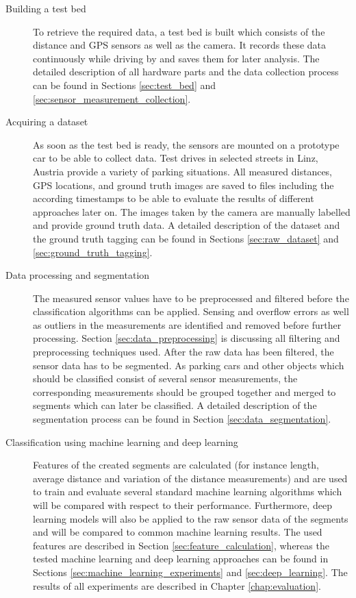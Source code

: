 \begin{description}

\item[Building a test bed] To retrieve the required data, a test bed is built which consists of the distance and GPS sensors as well as the camera. It records these data continuously while driving by and saves them for later analysis. The detailed description of all hardware parts and the data collection process can be found in Sections \ref{sec:test_bed} and \ref{sec:sensor_measurement_collection}.

\item[Acquiring a dataset] As soon as the test bed is ready, the sensors are mounted on a prototype car to be able to collect data. Test drives in selected streets in Linz, Austria provide a variety of parking situations. All measured distances, GPS locations, and ground truth images are saved to files including the according timestamps to be able to evaluate the results of different approaches later on. The images taken by the camera are manually labelled and provide ground truth data. A detailed description of the dataset and the ground truth tagging can be found in Sections \ref{sec:raw_dataset} and \ref{sec:ground_truth_tagging}.

\item[Data processing and segmentation] The measured sensor values have to be preprocessed and filtered before the classification algorithms can be applied. Sensing and overflow errors as well as outliers in the measurements are identified and removed before further processing. Section \ref{sec:data_preprocessing} is discussing all filtering and preprocessing techniques used. After the raw data has been filtered, the sensor data has to be segmented. As parking cars and other objects which should be classified consist of several sensor measurements, the corresponding measurements should be grouped together and merged to segments which can later be classified. A detailed description of the segmentation process can be found in Section \ref{sec:data_segmentation}.

\item[Classification using machine learning and deep learning] Features of the created segments are calculated (for instance length, average distance and variation of the distance measurements) and are used to train and evaluate several standard machine learning algorithms which will be compared with respect to their performance. Furthermore, deep learning models will also be applied to the raw sensor data of the segments and will be compared to common machine learning results. The used features are described in Section \ref{sec:feature_calculation}, whereas the tested machine learning and deep learning approaches can be found in Sections \ref{sec:machine_learning_experiments} and \ref{sec:deep_learning}. The results of all experiments are described in Chapter \ref{chap:evaluation}.


\end{description}
